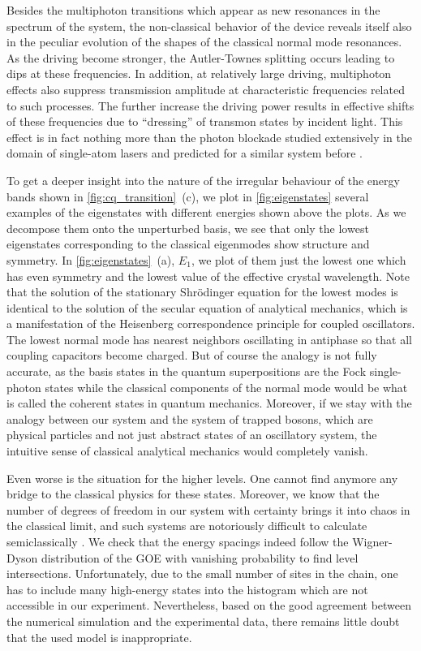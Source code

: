\documentclass[%
 aps, pra,
 amsmath,amssymb,
 reprint,%
superscriptaddress
]{revtex4-2}
\begin{document}
Besides the multiphoton transitions which appear as new resonances in the spectrum of the system, the non-classical behavior of the device reveals itself also in the peculiar evolution of the shapes of the classical normal mode resonances. As the driving become stronger, the Autler-Townes splitting occurs leading to dips at these frequencies. In addition, at relatively large driving, multiphoton effects also suppress transmission amplitude at characteristic frequencies related to such processes. The further increase the driving power results in effective shifts of these frequencies due to ``dressing'' of transmon states by incident light. This effect is in fact nothing more than the photon blockade studied extensively in the domain of single-atom lasers \cite{birnbaum2005photon} and predicted for a similar system before \cite{Biella2015}.

To get a deeper insight into the nature of the irregular behaviour of the energy bands shown in \autoref{fig:cq_transition}~(c), we plot in \autoref{fig:eigenstates} several examples of the eigenstates with different energies shown above the plots. As we decompose them onto the unperturbed basis, we see that only the lowest eigenstates corresponding to the classical eigenmodes show structure and symmetry. In \autoref{fig:eigenstates}~(a), $E_1$, we plot of them just the lowest one which has even symmetry and the lowest value of the effective crystal wavelength. Note that the solution of the stationary Shrödinger equation for the lowest modes is identical to the solution of the secular equation of analytical mechanics, which is a manifestation of the Heisenberg correspondence principle for coupled oscillators. The lowest normal mode has nearest neighbors oscillating in antiphase so that all coupling capacitors become charged. But of course the analogy is not fully accurate, as the basis states in the quantum superpositions are the Fock single-photon states while the classical components of the normal mode would be what is called the coherent states in quantum mechanics. Moreover, if we stay with the analogy between our system and the system of trapped bosons, which are physical particles and not just abstract states of an oscillatory system, the intuitive sense of classical analytical mechanics would completely vanish.

Even worse is the situation for the higher levels. One cannot find anymore any bridge to the classical physics for these states. Moreover, we know that the number of degrees of freedom in our system with certainty brings it into chaos in the classical limit, and such systems are notoriously difficult to calculate semiclassically \cite{wintgen1992semiclassical}. We check that the energy spacings indeed follow the Wigner-Dyson distribution of the GOE 
\cite{bohigas1984characterization, livan2018introduction} with vanishing probability to find level intersections. Unfortunately, due to the small number of sites in the chain, one has to include many high-energy states into the histogram which are not accessible in our experiment. Nevertheless, based on the good agreement between the numerical simulation and the experimental data, there remains little doubt that the used model is inappropriate. 
\end{document}
